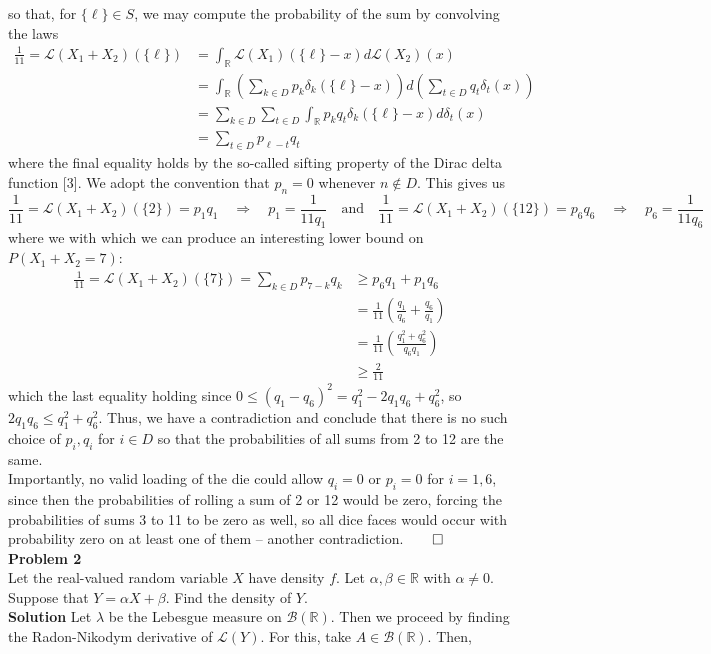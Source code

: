 \documentclass[10pt]{article}
\newcommand{\bp}[1]{\left({#1}\right)}
\newcommand{\mbb}[1]{\mathbb{#1}}
\newcommand{\1}[1]{\mathbbm{1}_{#1}}
\newcommand{\mc}[1]{\mathcal{#1}}
\begin{document}
    so that, for $\{\ell\}\in S$, we may compute the probability of the sum by convolving the laws
    \begin{align*}
        \frac{1}{11}=\mc{L}(X_1+X_2)(\{\ell\})&=\int_\mbb{R}\mc{L}(X_1)(\{\ell\}-x)d\mc{L}(X_2)(x)\\
        &=\int_\mbb{R}\bp{\sum_{k\in D}p_k\delta_k(\{\ell\}-x)}d\bp{\sum_{t\in D}q_t\delta_t(x)}\\
        &=\sum_{k\in D}\sum_{t\in D}\int_\mbb{R}p_kq_t\delta_k(\{\ell\}-x)d\delta_t(x)\\
        &=\sum_{t\in D}p_{\ell-t}q_t
    \end{align*}
    where the final equality holds by the so-called sifting property of the Dirac delta function [3]. We adopt the convention that $p_n=0$ whenever $n\notin D$. This gives us
    \[\frac{1}{11}=\mc{L}(X_1+X_2)(\{2\})=p_1q_1\quad\Rightarrow\quad p_1=\frac{1}{11q_1}\quad\text{and}\quad\frac{1}{11}=\mc{L}(X_1+X_2)(\{12\})=p_6q_6\quad\Rightarrow\quad p_6=\frac{1}{11q_6}\]
    where we with which we can produce an interesting lower bound on $P(X_1+X_2=7)$:
    \begin{align*}
        \frac{1}{11}=\mc{L}(X_1+X_2)(\{7\})=\sum_{k\in D}p_{7-k}q_k
        &\geq p_6q_1+p_1q_6\\
        &=\frac{1}{11}\bp{\frac{q_1}{q_6}+\frac{q_6}{q_1}}\\
        &=\frac{1}{11}\bp{\frac{q_1^2+q_6^2}{q_6q_1}}\\
        &\geq \frac{2}{11}
    \end{align*}
    which the last equality holding since $0\leq (q_1-q_6)^2=q_1^2-2q_1q_6+q_6^2$, so $2q_1q_6\leq q_1^2+q_6^2$. Thus, we have a contradiction and conclude that there is no such choice of $p_i,q_i$ for $i\in D$ so that the probabilities of all sums from 2 to 12 are the same.\\[5pt]
    Importantly, no valid loading of the die could allow $q_i=0$ or $p_i=0$ for $i=1,6$, since then
    the probabilities of rolling a sum of 2 or 12 would be zero, forcing the probabilities of sums 3 to 11 to be zero as well, so all dice faces would occur with probability zero on at least one of them -- another contradiction.\hfill{$\qed$}\\[5pt]
    {\bf Problem 2}\\[5pt]
    Let the real-valued random variable $X$ have density $f$. Let $\alpha,\beta\in\mbb{R}$ with $\alpha\neq 0$. Suppose that $Y=\alpha X+\beta$. Find the density of $Y$.\\[5pt]
    {\bf Solution}\hspace{5pt} Let $\lambda$ be the Lebesgue measure on $\mc{B}(\mbb{R})$. Then we proceed by finding the Radon-Nikodym derivative of $\mc{L}(Y)$. For this, take $A\in\mc{B}(\mbb{R})$. Then,
\end{document}
